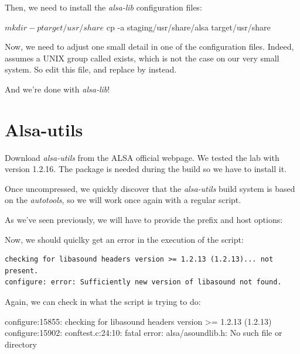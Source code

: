 Then, we need to install the {\em alsa-lib} configuration files:

\begin{bashinput}
$ mkdir -p target/usr/share
$ cp -a staging/usr/share/alsa target/usr/share
\end{bashinput}

Now, we need to adjust one small detail in one of the configuration
files. Indeed,  assumes a UNIX group
called  exists, which is not the case on our very small
system. So edit this file, and replace  by  instead.

And we're done with {\em alsa-lib}!

\section{Alsa-utils}


Download {\em alsa-utils} from the ALSA official webpage. We tested the lab
with version 1.2.16. The  package is needed during the build
so we have to install it.


Once uncompressed, we quickly discover that the {\em alsa-utils} build
system is based on the {\em autotools}, so we will work once again
with a regular  script.

As we've seen previously, we will have to provide the prefix and host
options:


Now, we should quiclky get an error in the execution of the
 script:

\begin{verbatim}
checking for libasound headers version >= 1.2.13 (1.2.13)... not present.
configure: error: Sufficiently new version of libasound not found.
\end{verbatim}

Again, we can check in  what the 
script is trying to do:

\begin{terminaloutput}
configure:15855: checking for libasound headers version >= 1.2.13 (1.2.13)
configure:15902: %
conftest.c:24:10: fatal error: alsa/asoundlib.h: No such file or directory
\end{terminaloutput}
\normalsize

